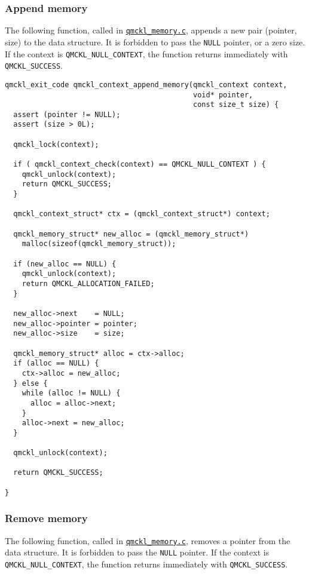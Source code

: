 \subsubsection{Append memory}
\label{sec:orgbdc2712}

The following function, called in \href{./qmckl\_memory.html}{\texttt{qmckl\_memory.c}}, appends a new
pair (pointer, size) to the data structure.
It is forbidden to pass the \texttt{NULL} pointer, or a zero size.
If the context is \texttt{QMCKL\_NULL\_CONTEXT}, the function returns
immediately with \texttt{QMCKL\_SUCCESS}.

\begin{verbatim}
qmckl_exit_code qmckl_context_append_memory(qmckl_context context,
                                            void* pointer,
                                            const size_t size) {
  assert (pointer != NULL);
  assert (size > 0L);

  qmckl_lock(context);

  if ( qmckl_context_check(context) == QMCKL_NULL_CONTEXT ) {
    qmckl_unlock(context);
    return QMCKL_SUCCESS;
  }

  qmckl_context_struct* ctx = (qmckl_context_struct*) context; 

  qmckl_memory_struct* new_alloc = (qmckl_memory_struct*)
    malloc(sizeof(qmckl_memory_struct));

  if (new_alloc == NULL) {
    qmckl_unlock(context);
    return QMCKL_ALLOCATION_FAILED;
  }
  
  new_alloc->next    = NULL;
  new_alloc->pointer = pointer;
  new_alloc->size    = size;

  qmckl_memory_struct* alloc = ctx->alloc;
  if (alloc == NULL) {
    ctx->alloc = new_alloc;
  } else {
    while (alloc != NULL) {
      alloc = alloc->next;
    }
    alloc->next = new_alloc;
  }
    
  qmckl_unlock(context);

  return QMCKL_SUCCESS;

}
\end{verbatim}

\subsubsection{Remove memory}
\label{sec:org3fef27a}

The following function, called in \href{./qmckl\_memory.html}{\texttt{qmckl\_memory.c}}, removes a 
pointer from the data structure.
It is forbidden to pass the \texttt{NULL} pointer.
If the context is \texttt{QMCKL\_NULL\_CONTEXT}, the function returns
immediately with \texttt{QMCKL\_SUCCESS}.

